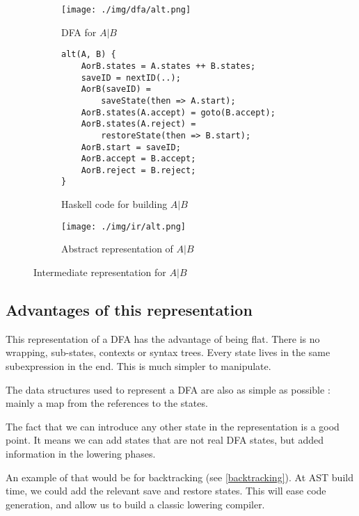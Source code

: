 \documentclass[11pt,a4paper]{report}
\newcommand{\regexp}[1]{$#1$}
\newcommand{\haskell}[1]{\textsf{#1}}
\begin{document}
\begin{figure}[h]
	\begin{subfigure}[h]{0.45\textwidth}
		\centering
		\texttt{[image: ./img/dfa/alt.png]}
		\caption{DFA for \regexp{A|B}}
	\end{subfigure}
	\hspace{0.05\textwidth}
	\begin{subfigure}[h]{0.45\textwidth}
		\centering
		\begin{lstlisting}[style=C]
alt(A, B) {
	AorB.states = A.states ++ B.states;
	saveID = nextID(..);
	AorB(saveID) = 
		saveState(then => A.start);
	AorB.states(A.accept) = goto(B.accept);
	AorB.states(A.reject) = 
		restoreState(then => B.start);
	AorB.start = saveID;
	AorB.accept = B.accept;
	AorB.reject = B.reject;
}
		\end{lstlisting}
		\caption{Haskell code for building \regexp{A|B}}
	\end{subfigure}
	
	\centering
	\begin{subfigure}[h]{0.85\textwidth}
		\centering
		\texttt{[image: ./img/ir/alt.png]}
		\caption{Abstract representation of \regexp{A|B}}
	\end{subfigure}
	\caption{Intermediate representation for \regexp{A|B}}
	\label{altir}
\end{figure}

\subsection{Advantages of this representation}

This representation of a DFA has the advantage of being flat. There is no wrapping, sub-states, contexts or syntax trees. Every state lives in the same subexpression in the end. This is much simpler to manipulate.

The data structures used to represent a DFA are also as simple as possible : mainly a map from the references to the states.

The fact that we can introduce any other state in the representation is a good point. It means we can add states that are not real DFA states, but added information in the lowering phases.

An example of that would be for backtracking (see \ref{backtracking}). At AST build time, we could add the relevant \haskell{save} and \haskell{restore} states. This will ease code generation, and allow us to build a classic lowering compiler.
\end{document}
